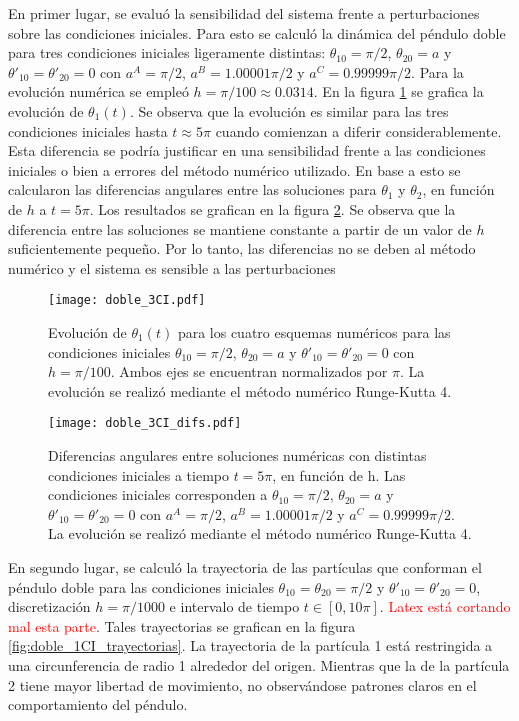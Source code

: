 \documentclass[aps,prb,twocolumn,superscriptaddress,floatfix,longbibliography,10pt]{revtex4-2}
\newcounter{para}
\begin{document}
En primer lugar, se evaluó la sensibilidad del sistema frente a perturbaciones sobre las condiciones iniciales. Para esto se calculó la dinámica del péndulo doble para tres condiciones iniciales ligeramente distintas: $\theta_{1 0} = \pi/2$, $\theta_{2 0} = a$ y $\theta'_{1 0} = \theta'_{2 0} = 0$ con $a^A = \pi/2$, $a^B = 1.00001 \pi/2$ y $a^C = 0.99999 \pi/2$. Para la evolución numérica se empleó $h = \pi/100 \approx 0.0314$. En la figura \ref{fig:doble_3CI} se grafica la evolución de $\theta_1(t)$. Se observa que la evolución es similar para las tres condiciones iniciales hasta $t \approx 5 \pi$ cuando comienzan a diferir considerablemente. Esta diferencia se podría justificar en una sensibilidad frente a las condiciones iniciales o bien a errores del método numérico utilizado. En base a esto se calcularon las diferencias angulares entre las soluciones para $\theta_1$ y $\theta_2$, en función de $h$ a $t = 5 \pi$. Los resultados se grafican en la figura \ref{fig:doble_3CI_difs}. Se observa que la diferencia entre las soluciones se mantiene constante a partir de un valor de $h$ suficientemente pequeño. Por lo tanto, las diferencias no se deben al método numérico y el sistema es sensible a las perturbaciones

\begin{figure}[h]
  \texttt{[image: doble\_3CI.pdf]}
  \caption{Evolución de $\theta_1(t)$ para los cuatro esquemas numéricos para las condiciones iniciales $\theta_{1 0} = \pi/2$, $\theta_{2 0} = a$ y $\theta'_{1 0} = \theta'_{2 0} = 0$ con $h = \pi/100$. Ambos ejes se encuentran normalizados por $\pi$. La evolución se realizó mediante el método numérico Runge-Kutta 4.}
   \label{fig:doble_3CI}
\end{figure}


\begin{figure}[h]
  \texttt{[image: doble\_3CI\_difs.pdf]}
  \caption{Diferencias angulares entre soluciones numéricas con distintas condiciones iniciales a tiempo $t = 5 \pi$, en función de h. Las condiciones iniciales corresponden a $\theta_{1 0} = \pi/2$, $\theta_{2 0} = a$ y $\theta'_{1 0} = \theta'_{2 0} = 0$ con $a^A = \pi/2$, $a^B = 1.00001 \pi/2$ y $a^C = 0.99999 \pi/2$. La evolución se realizó mediante el método numérico Runge-Kutta 4.}
   \label{fig:doble_3CI_difs}
\end{figure}

En segundo lugar, se calculó la trayectoria de las partículas que conforman el péndulo doble para las condiciones iniciales $\theta_{1 0} = \theta_{2 0} = \pi/2$ y $\theta'_{1 0} = \theta'_{2 0} = 0$, discretización $h = \pi/1000$ e intervalo de tiempo $t \in [0, 10 \pi]$. \textcolor{red}{Latex está cortando mal esta parte}. Tales trayectorias se grafican en la figura \ref{fig:doble_1CI_trayectorias}. La trayectoria de la partícula 1 está restringida a una circunferencia de radio 1 alrededor del origen. Mientras que la de la partícula 2 tiene mayor libertad de movimiento, no observándose patrones claros en el comportamiento del péndulo.
\end{document}
